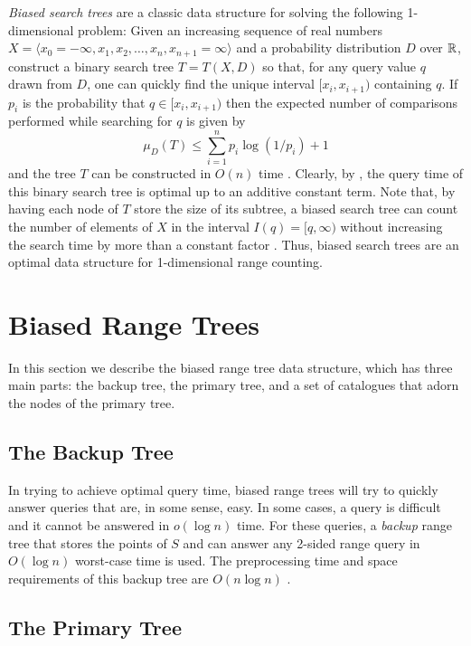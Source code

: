 \documentclass{patmorin}
\begin{document}
\emph{Biased search trees} are a classic data structure for solving
the following 1-dimensional problem:  Given an increasing sequence of
real numbers $X=\langle x_0=-\infty,x_1,x_2,\ldots ,
x_n,x_{n+1}=\infty\rangle$ and a probability distribution $D$ over
$\mathbb{R}$, construct a binary search tree  $T=T(X,D)$ so that, for any
query value $q$ drawn from $D$, one can quickly find the unique
interval $[x_i,x_{i+1})$ containing $q$.  If $p_i$ is the probability
that $q\in[x_i,x_{i+1})$ then the expected number of comparisons
performed while searching for $q$ is given
by
\[
   \mu_D(T) \le \sum_{i=1}^{n} p_i\log(1/p_i) + 1 
\]
and the tree $T$ can be constructed in $O(n)$ time \cite{m75}.  Clearly,
by , the query time of this binary search tree is
optimal up to an additive constant term.  Note that, by having each
node of $T$ store the size of its subtree, a biased search tree can
count the number of elements of $X$ in the interval $I(q)=[q,\infty)$
without increasing the search time by more than a constant factor
\cite[Chapter~14]{clrs09}. Thus, biased search trees are an optimal data
structure for 1-dimensional range counting.

\section{Biased Range Trees}

In this section we describe the biased range tree data structure,
which has three main parts: the backup tree, the primary tree, and a
set of catalogues that adorn the nodes of the primary tree.

\subsection{The Backup Tree}

In trying to achieve optimal query time, biased range trees will try
to quickly answer queries that are, in some sense, easy.  In some
cases, a query is difficult and it cannot be answered in $o(\log n)$
time.  For these queries, a \emph{backup} range tree that stores the
points of $S$ and can answer any 2-sided range query in $O(\log n)$
worst-case time is used.  The preprocessing time and space
requirements of this backup tree are $O(n\log n)$ \cite{bkos97}.

\subsection{The Primary Tree}
\end{document}
